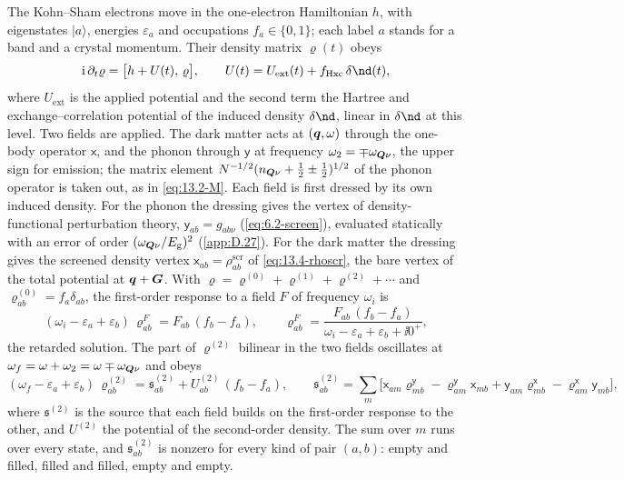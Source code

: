 The Kohn--Sham electrons move in the one-electron Hamiltonian $h$, with eigenstates $|a\rangle$, energies $\varepsilon_a$ and occupations $f_a \in \{0, 1\}$; each label $a$ stands for a band and a crystal momentum. Their density matrix $\varrho(t)$ obeys
\begin{equation*}
  \ii\,\partial_t\varrho = \bigl[h + U(t),\,\varrho\bigr] , \qquad U(t) = U_{\mathrm{ext}}(t) + f_{\mathrm{Hxc}}\,\delta\nd(t) ,
\end{equation*}
where $U_{\mathrm{ext}}$ is the applied potential and the second term the Hartree and exchange--correlation potential of the induced density $\delta\nd$, linear in $\delta\nd$ at this level. Two fields are applied. The dark matter acts at $(\bm{q},\omega)$ through the one-body operator $\mathsf{x}$, and the phonon through $\mathsf{y}$ at frequency $\omega_2 = \mp\omega_{\bm{Q}\nu}$, the upper sign for emission; the matrix element $N^{-1/2}(n_{\bm{Q}\nu} + \frac12 \pm \frac12)^{1/2}$ of the phonon operator is taken out, as in \cref{eq:13.2-M}. Each field is first dressed by its own induced density. For the phonon the dressing gives the vertex of density-functional perturbation theory, $\mathsf{y}_{ab} = g_{ab\nu}$ (\cref{eq:6.2-screen}), evaluated statically with an error of order $(\omega_{\bm{Q}\nu}/E_{\mathrm{g}})^2$ (\cref{app:D.27}). For the dark matter the dressing gives the screened density vertex $\mathsf{x}_{ab} = \rho^{\mathrm{scr}}_{ab}$ of \cref{eq:13.4-rhoscr}, the bare vertex of the total potential at $\bm{q} + \bm{G}$. With $\varrho = \varrho^{(0)} + \varrho^{(1)} + \varrho^{(2)} + \cdots$ and $\varrho^{(0)}_{ab} = f_a\delta_{ab}$, the first-order response to a field $F$ of frequency $\omega_i$ is
\begin{equation*}
  (\omega_i - \varepsilon_a + \varepsilon_b)\,\varrho^{F}_{ab} = F_{ab}\,(f_b - f_a) , \qquad \varrho^{F}_{ab} = \frac{F_{ab}\,(f_b - f_a)}{\omega_i - \varepsilon_a + \varepsilon_b + \ii0^+} ,
\end{equation*}
the retarded solution. The part of $\varrho^{(2)}$ bilinear in the two fields oscillates at $\omega_f = \omega + \omega_2 = \omega \mp \omega_{\bm{Q}\nu}$ and obeys
\begin{equation}
  (\omega_f - \varepsilon_a + \varepsilon_b)\,\varrho^{(2)}_{ab} = \mathfrak{s}^{(2)}_{ab} + U^{(2)}_{ab}\,(f_b - f_a) ,
  \qquad
  \mathfrak{s}^{(2)}_{ab} = \sum_m\bigl[\mathsf{x}_{am}\varrho^{\mathsf{y}}_{mb} - \varrho^{\mathsf{y}}_{am}\mathsf{x}_{mb} + \mathsf{y}_{am}\varrho^{\mathsf{x}}_{mb} - \varrho^{\mathsf{x}}_{am}\mathsf{y}_{mb}\bigr] ,
  \label{eq:D.36-second}
\end{equation}
where $\mathfrak{s}^{(2)}$ is the source that each field builds on the first-order response to the other, and $U^{(2)}$ the potential of the second-order density. The sum over $m$ runs over every state, and $\mathfrak{s}^{(2)}_{ab}$ is nonzero for every kind of pair $(a, b)$: empty and filled, filled and filled, empty and empty.

